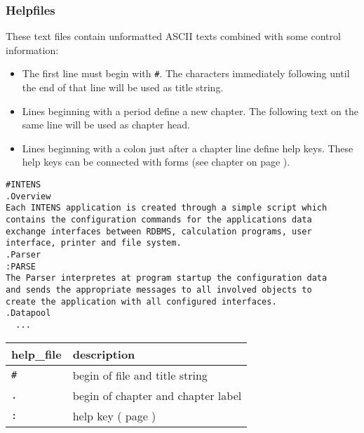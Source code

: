 \subsubsection{\INTENS{} Helpfiles}
\label{sec:hfintens}
These text files contain unformatted ASCII texts 
combined with some control
information:
\begin{itemize}
\item The first line must begin with \verb+#+. The characters immediately
       following until the end of that line
       will be used as title string.
\item Lines beginning with a period define a new chapter. The following
      text on the same line will be used as chapter head.
\item Lines beginning with a colon just after a chapter line define help keys.
      These help keys can be connected with forms (see chapter
        on page \pageref{key:helpkey}).
\end{itemize}

\newpage


\begin{boxedminipage}[t]{\linewidth}
\begin{verbatim}
#INTENS
.Overview
Each INTENS application is created through a simple script which
contains the configuration commands for the applications data
exchange interfaces between RDBMS, calculation programs, user
interface, printer and file system.
.Parser
:PARSE
The Parser interpretes at program startup the configuration data
and sends the appropriate messages to all involved objects to
create the application with all configured interfaces.
.Datapool
  ...
\end{verbatim}
\end{boxedminipage}


\vspace{0.5cm}

\begin{tabularx}{\textwidth}{l|X}
help\_file & description \\
\hline
\verb+#+   & begin of file and title string \\
\verb+.+   & begin of chapter and chapter label \\
\verb+:+   & help key (\nameref{key:helpkey} page \pageref{key:helpkey}) \\
\end{tabularx}

